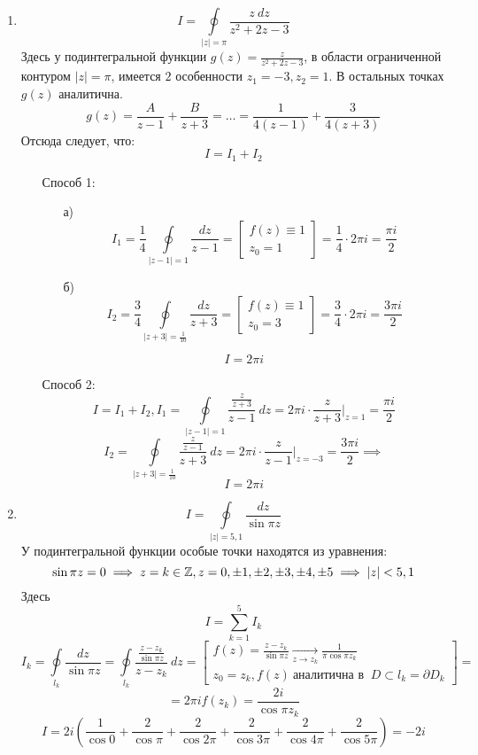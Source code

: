 \documentclass[../../main.tex]{subfiles}
\begin{document}
\begin{examples}
	\begin{enumerate}
		\item 
		\[ I = \oint \limits_{|z| = \pi} \frac{z \ dz}{z^2 + 2z - 3}  \]
		Здесь у подинтегральной функции $g(z) = \frac{z}{z^2 + 2z - 3}$, в области ограниченной контуром $|z| = \pi$, имеется $2$ особенности $z_1 = -3, z_2 = 1$. В остальных точках $g(z)$ аналитична.
		\[  g(z) = \frac{A}{z-1} + \frac{B}{z+3} = \dots = \frac{1}{4(z-1)} + \frac{3}{4(z+3)}  \]
		Отсюда следует, что:
		\[ I = I_1 + I_2  \]
		\begin{itemize}
			\item[Способ 1:]
			\begin{itemize}
				\item[а)]
				\[ I_1 = \frac{1}{4} \oint \limits_{|z-1| = 1} \frac{dz}{z-1} = \left[ \begin{gathered} f(z) \equiv 1 \\
				z_0 = 1 
				\end{gathered} \right] = \frac{1}{4} \cdot 2 \pi i = \frac{\pi i }{2}    \]
				\item[б)]  
				\[ I_2 = \frac{3}{4} \oint \limits_{|z+3| = \frac{1}{10}} \frac{dz}{z+3} = \left[ \begin{gathered} f(z) \equiv 1 \\
				z_0 = 3 
				\end{gathered} \right] = \frac{3}{4} \cdot 2 \pi i = \frac{3 \pi i }{2}    \]
			\end{itemize}
			\[ I = 2 \pi i \]
			\item[Способ 2:]
			\[  I = I_1 + I_2, I_1 = \oint \limits_{|z-1| = 1} \frac{\frac{z}{z+3}}{z-1} \ dz = 2 \pi i \cdot \frac{z}{z+3} \bigg|_{z=1} = \frac{\pi i}{2} \]
			\[ I_2 = \oint \limits_{|z+3| = \frac{1}{10}} \frac{\frac{z}{z-1}}{z+3} \ dz = 2 \pi i \cdot \frac{z}{z-1} \bigg|_{z=-3} = \frac{3 \pi i}{2} \implies  \]
			\[ I = 2 \pi i \]
		\end{itemize}
	\item \[ I = \oint \limits_{|z|=5,1} \frac{dz}{\sin{\pi z}} \]
	У подинтегральной функции особые точки находятся из уравнения:
	\[  \sin{\pi z} = 0 \implies z = k \in \mathbb{Z}, z = 0, \pm 1, \pm 2, \pm 3 , \pm 4 , \pm 5 \implies |z| < 5,1     \]
	Здесь 
	\[  I = \sum_{k=1}^{5} I_k       \]
	\[  I_k = \oint \limits_{l_k} \frac{dz}{\sin{\pi z}} = \oint \limits_{l_k} \frac{\frac{z-z_k}{\sin{\pi z}}}{z-z_k} \ dz = \left[ \begin{gathered} f(z) = \frac{z-z_k}{\sin{\pi z}} \underset{z \to z_k}{\rightarrow} \frac{1}{\pi \cos{\pi z_k}} \\
	z_0 = z_k, f(z) \ \text{аналитична в } \ D \subset l_k = \partial D_k 
	\end{gathered} \right] =          \]
	\[  = 2 \pi i f(z_k) = \frac{2i}{\cos{\pi z_k}}       \]
	\[   I = 2i \left( \frac{1}{\cos{0}} + \frac{2}{\cos{\pi}} + \frac{2}{\cos{2 \pi}} + \frac{2}{\cos{3 \pi}}  + \frac{2}{\cos{4 \pi}} + \frac{2}{\cos{5 \pi}}\right) = -2i      \]
	\end{enumerate}
\end{examples}
\end{document}
